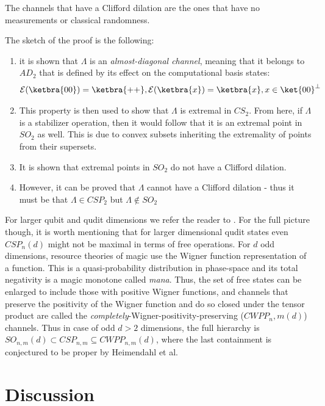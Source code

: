 The channels that have a Clifford dilation are the ones that have no measurements or classical randomness.

The sketch of the proof is the following: 
\begin{enumerate}
\item it is shown that $\Lambda$ is an \textit{almost-diagonal channel}, meaning that it belongs to $AD_2$ that is defined by its effect on the computational basis states: 
\begin{align}
\mathcal{E}(\ketbra{00})=\ketbra{++}, \mathcal{E}(\ketbra{x})=\ketbra{x}, x \in \ket{00}^\perp
\end{align}
\item This property is then used to show that $\Lambda$ is extremal in $CS_2$. From here, if $\Lambda$ is a stabilizer operation, then it would follow that it is an extremal point in $SO_2$ as well. This is due to convex subsets inheriting the extremality of points from their supersets. 
\item It is shown that extremal points in $SO_2$ do not have a Clifford dilation.
\item However, it can be proved that $\Lambda$ cannot have a Clifford dilation - thus it must be that $\Lambda \in CSP_2$ but $\Lambda \notin SO_2$
\end{enumerate}

For larger qubit and qudit dimensions we refer the reader to \cite{heimendahl_axiomatic_2022}. For the full picture though, it is worth mentioning that for larger dimensional qudit states even $CSP_n(d)$ might not be maximal in terms of free operations. For $d$ odd dimensions, resource theories of magic use the Wigner function representation of a function. This is a quasi-probability distribution in phase-space and its total negativity is a magic monotone called \textit{mana}. Thus, the set of free states can be enlarged to include those with positive Wigner functions, and channels that preserve the positivity of the Wigner function and do so closed under the tensor product are called the \textit{completely}-Wigner-positivity-preserving ($CWPP_n,m(d)$) channels. Thus in case of odd $d>2$ dimensions, the full hierarchy is $SO_{n,m}(d) \subset CSP_{n,m} \subseteq CWPP_{n,m}(d)$, where the last containment is conjectured to be proper by Heimendahl et al. 

\section{Discussion}\label{sec:discussion}


